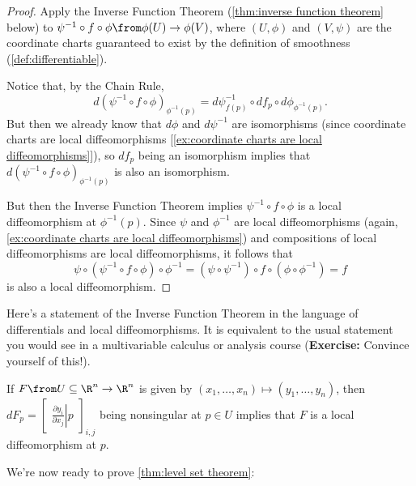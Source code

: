 \begin{proof}
	Apply the Inverse Function Theorem (\cref{thm:inverse function theorem} below) to $\psi^{-1} \circ f \circ \phi \from \phi(U) \to \phi(V)$, where $(U,\phi)$ and $(V, \psi)$ are the coordinate charts guaranteed to exist by the definition of smoothness (\cref{def:differentiable}).
	
	Notice that, by the Chain Rule,
	\[
		d(\psi^{-1} \circ f \circ \phi)_{\phi^{-1}(p)} = d\psi^{-1}_{f(p)} \circ df_p \circ d\phi_{\phi^{-1}(p)}.
	\]
	But then we already know that $d\phi$ and $d\psi^{-1}$ are isomorphisms (since coordinate charts are local diffeomorphisms [\cref{ex:coordinate charts are local diffeomorphisms}]), so $df_p$ being an isomorphism implies that $d(\psi^{-1} \circ f \circ \phi)_{\phi^{-1}(p)}$ is also an isomorphism.
	
	But then the Inverse Function Theorem implies $\psi^{-1} \circ f \circ \phi$ is a local diffeomorphism at $\phi^{-1}(p)$. Since $\psi$ and $\phi^{-1}$ are local diffeomorphisms (again, \cref{ex:coordinate charts are local diffeomorphisms}) and compositions of local diffeomorphisms are local diffeomorphisms, it follows that
	\[
		\psi \circ (\psi^{-1} \circ f \circ \phi) \circ \phi^{-1} = (\psi \circ \psi^{-1}) \circ f \circ (\phi \circ \phi^{-1}) = f
	\]
	is also a local diffeomorphism.
\end{proof}

Here's a statement of the Inverse Function Theorem in the language of differentials and local diffeomorphisms. It is equivalent to the usual statement you would see in a multivariable calculus or analysis course (\textbf{Exercise:} Convince yourself of this!).

\begin{theorem}\label{thm:inverse function theorem}
	If $F \from U \subseteq \R^n \to \R^n$ is given by $(x_1, \dots , x_n) \mapsto (y_1, \dots , y_n)$, then $dF_p = \begin{bmatrix} \left.\frac{\partial y_i}{\partial x_j}\right|p\end{bmatrix}_{i,j}$ being nonsingular at $p \in U$ implies that $F$ is a local diffeomorphism at $p$.
\end{theorem}

We're now ready to prove \cref{thm:level set theorem}:


